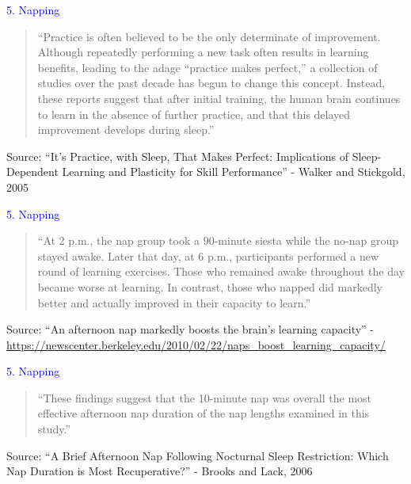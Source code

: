 \documentclass[landscape]{slides}
\begin{document}
\begin{slide}

    \textcolor{blue}{\Large{5. Napping}}

    \begin{quote}
        ``Practice is often believed to be the only determinate of improvement. Although repeatedly performing a new task often results in learning benefits, leading to the adage ``practice makes perfect,'' a collection of studies over the past decade has begun to change this concept. Instead, these reports suggest that after initial training, the human brain continues to learn in the absence of further practice, and that this delayed improvement develops during sleep.''
    \end{quote}

    \small{Source: ``It’s Practice, with Sleep, That Makes Perfect: Implications of Sleep-Dependent Learning and Plasticity for Skill Performance'' - Walker and Stickgold, 2005}

\end{slide}




\begin{slide}

    \textcolor{blue}{\Large{5. Napping}}

    \begin{quote}
        ``At 2 p.m., the nap group took a 90-minute siesta while the no-nap group stayed awake. Later that day, at 6 p.m., participants performed a new round of learning exercises. Those who remained awake throughout the day became worse at learning. In contrast, those who napped did markedly better and actually improved in their capacity to learn.''
    \end{quote}

    \small{Source: ``An afternoon nap markedly boosts the brain’s learning capacity'' - \url{https://newscenter.berkeley.edu/2010/02/22/naps_boost_learning_capacity/}}

\end{slide}


\begin{slide}

    \textcolor{blue}{\Large{5. Napping}}

    \begin{quote}
        ``These findings suggest that the 10-minute nap was overall the most effective afternoon nap duration of the nap lengths examined in this study.''
    \end{quote}

    \small{Source: ``A Brief Afternoon Nap Following Nocturnal Sleep Restriction: Which Nap Duration is Most Recuperative?'' - Brooks and Lack, 2006}

\end{slide}
\end{document}
